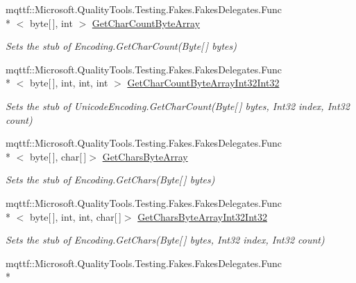 \begin{DoxyCompactItemize}
mqttf\-::\-Microsoft.\-Quality\-Tools.\-Testing.\-Fakes.\-Fakes\-Delegates.\-Func\\*
$<$ byte\mbox{[}$\,$\mbox{]}, int $>$ \hyperlink{class_system_1_1_text_1_1_fakes_1_1_stub_unicode_encoding_acd478b6851a146648f749f633ef8a754}{Get\-Char\-Count\-Byte\-Array}
\begin{DoxyCompactList}\small\item\em Sets the stub of Encoding.\-Get\-Char\-Count(\-Byte\mbox{[}$\,$\mbox{]} bytes)\end{DoxyCompactList}\item 
mqttf\-::\-Microsoft.\-Quality\-Tools.\-Testing.\-Fakes.\-Fakes\-Delegates.\-Func\\*
$<$ byte\mbox{[}$\,$\mbox{]}, int, int, int $>$ \hyperlink{class_system_1_1_text_1_1_fakes_1_1_stub_unicode_encoding_aaefb4995217ab4dd93773a268fdca142}{Get\-Char\-Count\-Byte\-Array\-Int32\-Int32}
\begin{DoxyCompactList}\small\item\em Sets the stub of Unicode\-Encoding.\-Get\-Char\-Count(\-Byte\mbox{[}$\,$\mbox{]} bytes, Int32 index, Int32 count)\end{DoxyCompactList}\item 
mqttf\-::\-Microsoft.\-Quality\-Tools.\-Testing.\-Fakes.\-Fakes\-Delegates.\-Func\\*
$<$ byte\mbox{[}$\,$\mbox{]}, char\mbox{[}$\,$\mbox{]}$>$ \hyperlink{class_system_1_1_text_1_1_fakes_1_1_stub_unicode_encoding_a56c5305dee61fe19356529d6321207c9}{Get\-Chars\-Byte\-Array}
\begin{DoxyCompactList}\small\item\em Sets the stub of Encoding.\-Get\-Chars(\-Byte\mbox{[}$\,$\mbox{]} bytes)\end{DoxyCompactList}\item 
mqttf\-::\-Microsoft.\-Quality\-Tools.\-Testing.\-Fakes.\-Fakes\-Delegates.\-Func\\*
$<$ byte\mbox{[}$\,$\mbox{]}, int, int, char\mbox{[}$\,$\mbox{]}$>$ \hyperlink{class_system_1_1_text_1_1_fakes_1_1_stub_unicode_encoding_ae38c8e73cd08d0b82e07ac6dd14e8e40}{Get\-Chars\-Byte\-Array\-Int32\-Int32}
\begin{DoxyCompactList}\small\item\em Sets the stub of Encoding.\-Get\-Chars(\-Byte\mbox{[}$\,$\mbox{]} bytes, Int32 index, Int32 count)\end{DoxyCompactList}\item 
mqttf\-::\-Microsoft.\-Quality\-Tools.\-Testing.\-Fakes.\-Fakes\-Delegates.\-Func\\*

\end{DoxyCompactItemize}
